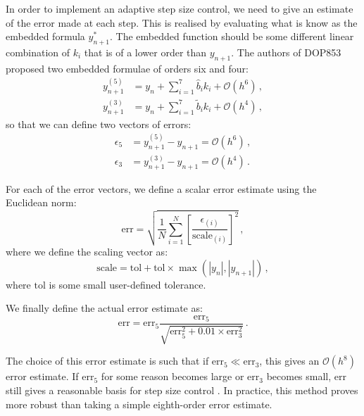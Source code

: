 \documentclass[11pt, twocolumn]{article}
\begin{document}
In order to implement an adaptive step size control, we need to give an estimate of the error made at each step. This is realised by evaluating what is know as the embedded formula $y_{n+1}^{*}$. The embedded function should be some different linear combination of $k_{i}$ that is of a lower order than $y_{n+1}$. The authors of DOP853 proposed two embedded formulae of orders six and four:
\begin{equation}
    \begin{split}
        y_{n+1}^{(5)} &= y_{n} + \sum_{i=1}^{7} \hat{b}_{i} k_{i} + \mathcal{O}(h^{6}) \, , \\
        y_{n+1}^{(3)} &= y_{n} + \sum_{i=1}^{7} \tilde{b}_{i} k_{i} + \mathcal{O}(h^{4}) \, ,
    \end{split}
\end{equation}
so that we can define two vectors of errors:
\begin{equation}
    \begin{split}
        \epsilon_{5} &= y_{n+1}^{(5)} - y_{n+1} = \mathcal{O}(h^{6}) \, , \\
        \epsilon_{3} &= y_{n+1}^{(3)} - y_{n+1} = \mathcal{O}(h^{4}) \, .
    \end{split}
\end{equation}

For each of the error vectors, we define a scalar error estimate using the Euclidean norm:
\begin{equation}
    \text{err} = \sqrt{\frac{1}{N} \sum_{i=1}^{N} \left[ \frac{\epsilon_{(i)}}{\text{scale}_{(i)}} \right]^{2}} \, ,
\end{equation}
where we define the scaling vector as:
\begin{equation}
    \text{scale} = \text{tol} + \text{tol} \times \max(|y_{n}|, |y_{n+1}|) \, ,
\end{equation}
where $\text{tol}$ is some small user-defined tolerance.

We finally define the actual error estimate as:
\begin{equation}
    \text{err} = \text{err}_{5} \frac{\text{err}_{5}}{\sqrt{\text{err}_{5}^{2} + 0.01 \times \text{err}_{3}^{2}}}\, .
\end{equation}

The choice of this error estimate is such that if $\text{err}_{5} \ll \text{err}_{3}$, this gives an $\mathcal{O}(h^{8})$ error estimate. If $\text{err}_{5}$ for some reason becomes large or $\text{err}_{3}$ becomes small, $\text{err}$ still gives a reasonable basis for step size control \cite{Press2007}. In practice, this method proves more robust than taking a simple eighth-order error estimate.
\end{document}
